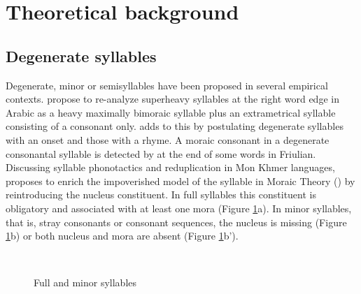 \documentclass[output=paper,colorlinks,citecolor=brown]{langscibook}
\begin{document}
\section{Theoretical background}\label{theoretical}
\subsection{Degenerate syllables}\label{degen}

Degenerate, minor or semisyllables have been proposed in several empirical contexts. \citet{MccarthyPrince1990} propose to re-analyze superheavy syllables at the right word edge in Arabic as a heavy maximally bimoraic syllable plus an extrametrical syllable consisting of a consonant only. \citet{Broselow1992} adds to this by postulating degenerate syllables with an onset and those with a rhyme. A moraic consonant in a degenerate consonantal syllable is detected by \citet{Repetti1994} at the end of some words in Friulian. Discussing syllable phonotactics and reduplication in Mon Khmer languages, \citet{Shaw1994} proposes to enrich the impoverished model of the syllable in Moraic Theory (\citealt{Hayes:1989,Zec1995}) by reintroducing the nucleus constituent. In full syllables this constituent is obligatory and associated with at least one mora (Figure \ref{syll_type}a). In minor syllables, that is, stray consonants or consonant sequences, the nucleus is missing (Figure \ref{syll_type}b) or both nucleus and mora are absent (Figure \ref{syll_type}b').

\begin{figure}
\caption{Full and minor syllables \citep{Shaw1994}}
\label{syll_type}
~
~
\renewcommand\thesubfigure{(b')}%
\end{figure}
\end{document}
